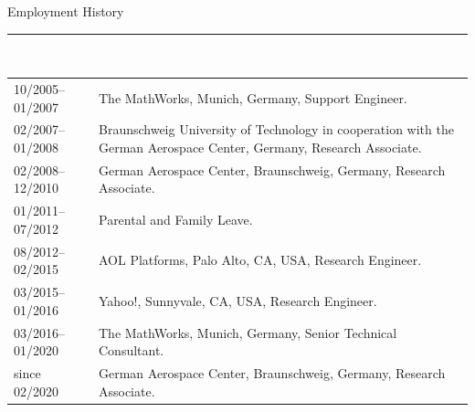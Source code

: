 \bigskip
\large Employment History\\[-8pt]
\noindent\rule{15.25cm}{0.4pt}\\[3pt]
\normalsize
\begin{tabular}{@{}p{3.2cm}p{11.3cm}@{}}
    10/2005--01/2007 & The MathWorks, Munich, Germany, %
    Support Engineer. \\[5pt]
    02/2007--01/2008 &  Braunschweig University of Technology in cooperation with the German Aerospace Center, Germany,  Research Associate. \\[18pt]
    02/2008--12/2010 & German Aerospace Center, Braunschweig, Germany, %
    Research Associate. \\[18pt]
    01/2011--07/2012 & Parental and Family Leave. \\[5pt]
    08/2012--02/2015 & AOL Platforms, Palo Alto, CA, USA, %
    Research Engineer. \\[5pt]
    03/2015--01/2016 & Yahoo!, Sunnyvale, CA, USA, %
    Research Engineer. \\[5pt]
    03/2016--01/2020 & The MathWorks, Munich, Germany, %
    Senior Technical Consultant. \\[5pt]
    since 02/2020 & German Aerospace Center, Braunschweig, Germany, %
    Research Associate. \\
\end{tabular}